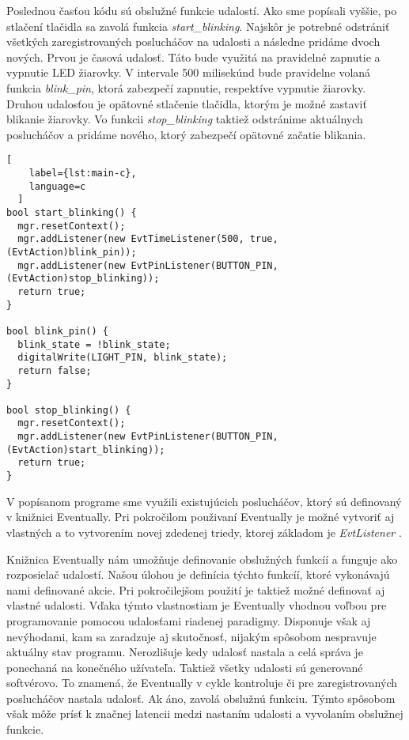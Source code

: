 \par Poslednou časťou kódu sú obslužné funkcie udalostí. Ako sme popísali vyššie, po stlačení tlačidla sa zavolá funkcia \textit{start\_blinking}. Najskôr je potrebné odstrániť všetkých zaregistrovaných poslucháčov na udalosti a následne pridáme dvoch nových. Prvou je časová udalosť. Táto bude využitá na pravidelné zapnutie a vypnutie LED žiarovky. V intervale 500 milisekúnd bude pravidelne volaná funkcia \textit{blink\_pin}, ktorá zabezpečí zapnutie, respektíve vypnutie žiarovky. Druhou udalosťou je opätovné stlačenie tlačidla, ktorým je možné zastaviť blikanie žiarovky. Vo funkcii \textit{stop\_blinking} taktiež odstránime aktuálnych poslucháčov a pridáme nového, ktorý zabezpečí opätovné začatie blikania. 

\begin{lstlisting}[
    label={lst:main-c},
    language=c
  ]
bool start_blinking() {
  mgr.resetContext(); 
  mgr.addListener(new EvtTimeListener(500, true, (EvtAction)blink_pin));
  mgr.addListener(new EvtPinListener(BUTTON_PIN, (EvtAction)stop_blinking));
  return true;
}

bool blink_pin() {
  blink_state = !blink_state;
  digitalWrite(LIGHT_PIN, blink_state);
  return false;
}
  
bool stop_blinking() {
  mgr.resetContext();
  mgr.addListener(new EvtPinListener(BUTTON_PIN, (EvtAction)start_blinking));
  return true;
}

\end{lstlisting}

\par V popísanom programe sme využili existujúcich poslucháčov, ktorý sú definovaný v knižnici Eventually. Pri pokročilom použivaní Eventually je možné vytvoriť aj vlastných a to vytvorením novej zdedenej triedy, ktorej základom je \textit{EvtListener} \cite{bartlettEventually2021}.

\par Knižnica Eventually nám umožňuje definovanie obslužných funkcíí a funguje ako rozposielač udalostí. Našou úlohou je definícia týchto funkcíí, ktoré vykonávajú nami definované akcie.
Pri pokročilejšom použití je taktiež možné definovať aj vlastné udalosti. Vďaka týmto 
vlastnostiam je Eventually vhodnou voľbou pre programovanie pomocou udalosťami riadenej 
paradigmy. Disponuje však aj nevýhodami, kam sa zaradzuje aj skutočnosť, nijakým spôsobom nespravuje aktuálny stav programu. Nerozlišuje kedy udalosť nastala a celá správa je ponechaná na konečného užívateľa.
Taktiež všetky udalosti sú generované softvérovo. To znamená, že Eventually v cykle kontroluje či pre zaregistrovaných poslucháčov nastala udalosť. Ak áno, zavolá obslužnú funkciu. Týmto spôsobom však môže prísť k značnej latencii medzi nastaním udalosti a vyvolaním obslužnej funkcie.